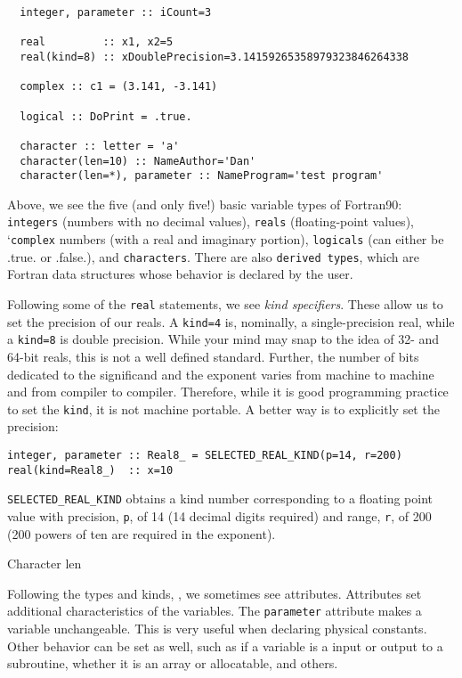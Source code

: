 \documentclass[11pt, letterpaper]{article}
\begin{document}
\begin{verbatim}
  integer, parameter :: iCount=3

  real         :: x1, x2=5
  real(kind=8) :: xDoublePrecision=3.14159265358979323846264338
  
  complex :: c1 = (3.141, -3.141)

  logical :: DoPrint = .true.

  character :: letter = 'a'
  character(len=10) :: NameAuthor='Dan' 
  character(len=*), parameter :: NameProgram='test program'
\end{verbatim}

Above, we see the five (and only five!) basic variable types of Fortran90:
\texttt{integers} (numbers with no decimal values), \texttt{reals} (floating-point
values), `\texttt{complex} numbers (with a real and imaginary portion),
\texttt{logicals} (can either be .true. or .false.), and \texttt{characters}.  There
are also \texttt{derived types}, which are Fortran data structures whose
behavior is declared by the user.

Following some of the \texttt{real} statements, we see \emph{kind specifiers}.
These allow us to set the precision of our reals.  A \texttt{kind=4} is,
nominally, a single-precision real, while a \texttt{kind=8} is double precision.
While your mind may snap to the idea of 32- and 64-bit reals, this is not
a well defined standard.  Further, the number of bits dedicated to the
significand and the exponent varies from machine to machine and from
compiler to compiler.  Therefore, while it is good programming practice to
set the \texttt{kind}, it is not machine portable.  A better way is to explicitly
set the precision:
\begin{verbatim}
integer, parameter :: Real8_ = SELECTED_REAL_KIND(p=14, r=200)
real(kind=Real8_)  :: x=10
\end{verbatim}
\texttt{SELECTED\_REAL\_KIND} obtains a kind number corresponding to a floating
point value with precision, \texttt{p}, of 14 (14 decimal digits required) and
range, \texttt{r}, of 200 (200 powers of ten are required in the exponent).

Character len

Following the types and kinds, , we sometimes see attributes.  Attributes set
additional characteristics of the variables.  The \texttt{parameter} attribute
makes a variable unchangeable.  This is very useful when declaring physical
constants.  Other behavior can be set as well, such as if a variable is a input
or output to a subroutine, whether it is an array or allocatable, and others.
\end{document}
